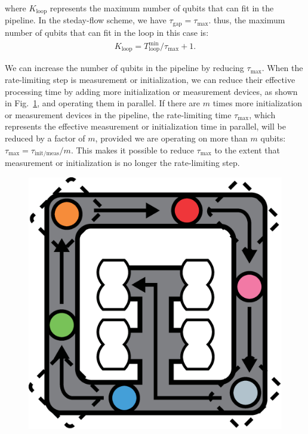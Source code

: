 \documentclass[a4paper,11pt]{ltjsarticle}
\begin{document}
{{        where $K_\text{loop}$ represents the maximum number of qubits that can fit in the pipeline. In the steday-flow scheme, we have $\tau_\text{gap} = \tau_\text{max}$. thus, the maximum number of qubits that can fit in the loop in this case is:
        \begin{align}
            K_\text{loop} = T_\text{loop}^\text{min}/\tau_\text{max} + 1.
        \end{align}

        We can increase the number of qubits in the pipeline by reducing $\tau_\text{max}$. When the rate-limiting step is measurement or initialization, we can reduce their effective processing time by adding more initialization or measurement devices, as shown in Fig.~\ref{more_devices}, and operating them in parallel. If there are $m$ times more initialization or measurement devices in the pipeline, the rate-limiting time $\tau_\text{max}$, which represents the effective measurement or initialization time in parallel, will be reduced by a factor of $m$, provided we are operating on more than $m$ qubits: $\tau_\text{max} = \tau_\text{init/meas}/m$. This makes it possible to reduce $\tau_\text{max}$ to the extent that measurement or initialization is no longer the rate-limiting step.

        \begin{figure}[h]
            \centering
            \includegraphics[scale=0.20]{figure/more_devices.eps}
            \vspace{0pt}\caption{}
            \label{more_devices}
        \end{figure}
    }
}
\end{document}
